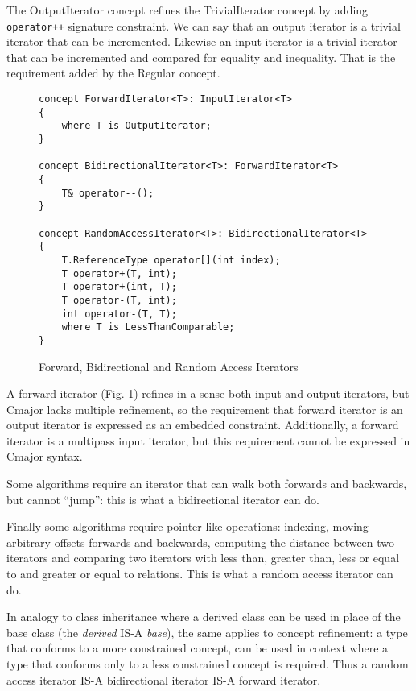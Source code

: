 \documentclass[oneside, a4paper, 11pt]{article}
\begin{document}
The OutputIterator concept refines the TrivialIterator concept by
adding \verb|operator++| signature constraint.
We can say that an output iterator is a trivial iterator that can
be incremented.
Likewise an input iterator is a trivial iterator that can be incremented and
compared for equality and inequality.
That is the requirement added by the Regular concept.

\begin{figure}[htb]\caption{Forward, Bidirectional and Random Access Iterators}\label{fig:fwdbidraiterators}
\begin{lstlisting}[frame=trBL]
concept ForwardIterator<T>: InputIterator<T>
{
    where T is OutputIterator;
}

concept BidirectionalIterator<T>: ForwardIterator<T>
{
    T& operator--();
}

concept RandomAccessIterator<T>: BidirectionalIterator<T>
{
    T.ReferenceType operator[](int index);
    T operator+(T, int);
    T operator+(int, T);
    T operator-(T, int);
    int operator-(T, T);
    where T is LessThanComparable;
}
\end{lstlisting}
\end{figure}

A forward iterator (Fig. \ref{fig:fwdbidraiterators}) refines in a sense both input and output iterators, but Cmajor lacks
multiple refinement, so the requirement that forward iterator is an output iterator is
expressed as an embedded constraint.
Additionally, a forward iterator is a multipass input iterator, but this requirement cannot
be expressed in Cmajor syntax.

Some algorithms require an iterator that can walk both forwards and backwards, but cannot ``jump'':
this is what a bidirectional iterator can do.

Finally some algorithms require pointer-like operations: indexing, moving arbitrary offsets forwards and backwards,
computing the distance between two iterators and comparing two iterators with less than, greater than,
less or equal to and greater or equal to relations.
This is what a random access iterator can do.

In analogy to class inheritance where a derived class can be used in place of the base class
(the \emph{derived} IS-A \emph{base}), the same applies to concept refinement:
a type that conforms to a more constrained concept, can be used in context where
a type that conforms only to a less constrained concept is required.
Thus a random access iterator IS-A bidirectional iterator IS-A forward iterator.
\end{document}
